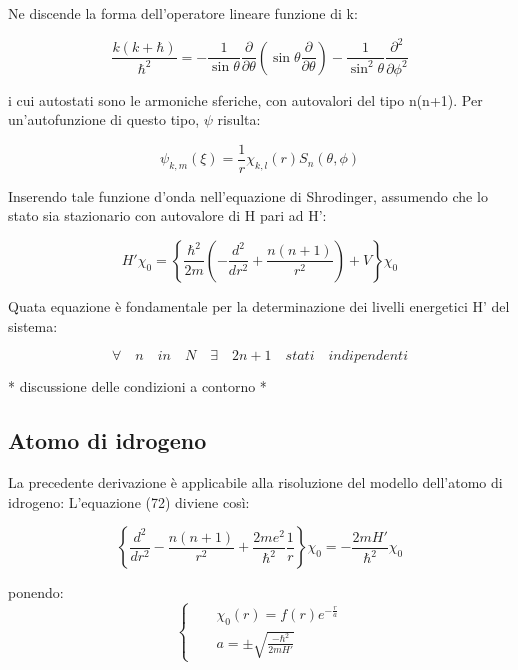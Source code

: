 \documentclass{article}
\begin{document}
Ne discende la forma dell'operatore lineare funzione di k:

\begin{equation}
    \frac{k(k+\hbar)}{\hbar^2}= -\frac{1}{\sin{\theta}}\frac{\partial}{\partial \theta}\left ( \sin{\theta}\frac{\partial}{\partial \theta} \right ) - \frac{1}{\sin^2{\theta}}\frac{\partial^2}{\partial \phi^2}
\end{equation}

i cui autostati sono le armoniche sferiche, con autovalori del tipo n(n+1). Per un'autofunzione di questo tipo, $\psi$ risulta:

\begin{equation}
    \psi_{k,m}(\xi)=\frac{1}{r}\chi_{k,l}(r)S_n(\theta, \phi)
\end{equation}

Inserendo tale funzione d'onda nell'equazione di Shrodinger, assumendo che lo stato sia stazionario con autovalore di H pari ad H':

\begin{equation}
    H' \chi_0=\left\{\frac{\hbar^2}{2m}\left( -\frac{d^2}{dr^2}+\frac{n(n+1)}{r^2}\right)+V \right\}\chi_0
\end{equation}

Quata equazione è fondamentale per la determinazione dei livelli energetici H' del sistema:

\begin{equation}
    \forall \quad n \quad in \quad N \quad \exists \quad 2n+1 \quad stati \quad indipendenti
\end{equation}


* discussione delle condizioni a contorno *

\subsection{Atomo di idrogeno}
La precedente derivazione è applicabile alla risoluzione del modello dell'atomo di idrogeno:
L'equazione (72) diviene così:

\begin{equation}
    \left\{\frac{d^2}{dr^2} -\frac{n(n+1)}{r^2} +\frac{2me^2}{\hbar^2}\frac{1}{r} \right\}\chi_0= -\frac{2mH'}{\hbar^2}\chi_0
\end{equation}

ponendo:
\begin{equation}
    \left\{
    \begin{aligned}
         &  & \chi_0(r)=f(r)e^{-\frac{r}{a}}     \\
         &  & a=\pm \sqrt{\frac{-\hbar^2}{2mH'}}
    \end{aligned}
    \right.
\end{equation}
\end{document}
